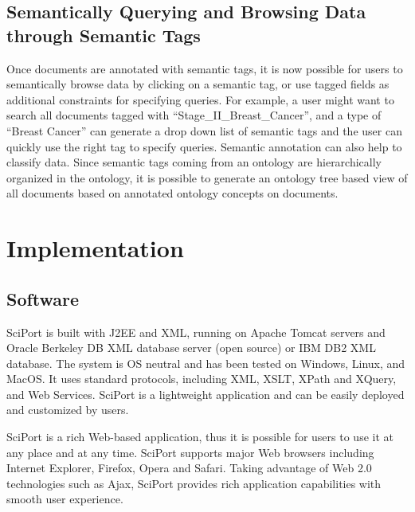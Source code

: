 \documentclass{doublecol-new}
\theoremstyle{TH}{
\newtheorem{lemma}{Lemma}
\newtheorem{theorem}[lemma]{Theorem}
\newtheorem{corrolary}[lemma]{Corrolary}
\newtheorem{conjecture}[lemma]{Conjecture}
\newtheorem{proposition}[lemma]{Proposition}
\newtheorem{claim}[lemma]{Claim}
\newtheorem{stheorem}[lemma]{Wrong Theorem}
\newtheorem{algorithm}{Algorithm}
}
\theoremstyle{THrm}{
\newtheorem{definition}{Definition}[section]
\newtheorem{question}{Question}[section]
\newtheorem{remark}{Remark}
\newtheorem{scheme}{Scheme}
}
\theoremstyle{THhit}{
\newtheorem{case}{Case}[section]
}
\begin{document}
\subsection{Semantically Querying and Browsing Data through Semantic Tags}

Once documents are annotated with semantic tags, it is now possible
for users to semantically browse data by clicking on a semantic tag,
or use tagged fields as additional constraints for specifying
queries.  For example, a user might want to  search all documents
tagged with ``Stage\_II\_Breast\_Cancer'', and a type of ``Breast
Cancer'' can generate a drop down list of semantic tags and the user
can quickly use the right tag to specify queries.  Semantic
annotation can also help to classify data. Since semantic tags
coming from an ontology are hierarchically organized in the
ontology,  it is possible to generate an ontology tree based view of
all documents based on annotated ontology concepts on documents.





\section{Implementation}

\subsection{Software}

SciPort is built with J2EE and XML, running on Apache Tomcat servers
and Oracle Berkeley DB XML database server (open source) or IBM DB2
XML database. The system is OS neutral and has been tested on
Windows, Linux, and MacOS. It uses standard protocols, including
XML, XSLT, XPath and XQuery, and Web Services. SciPort is a
lightweight application and can be easily deployed and customized
by users.

SciPort is a rich Web-based application, thus it is possible for
users to use it at any place and at any time. SciPort supports major
Web browsers including Internet Explorer, Firefox, Opera and Safari.
Taking advantage of Web 2.0 technologies such as Ajax, SciPort
provides rich application capabilities with smooth user experience.
\end{document}
